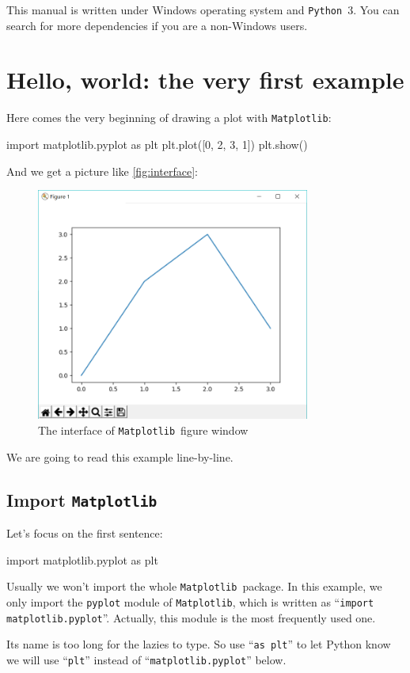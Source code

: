 \documentclass{report}
\newcommand{\pkg}[1]{\texttt{#1}}
\newcommand{\Py}{\pkg{Python}}
\newcommand{\mpl}{\texttt{Matplotlib}}
\newcommand{\nextblock}{\vspace{2ex}}
\begin{document}
\nextblock This manual is written under Windows operating system and \Py\ 3. You can search for more dependencies if you are a non-Windows users.

\section{Hello, world: the very first example}
Here comes the very beginning of drawing a plot with \mpl :
\begin{py}
import matplotlib.pyplot as plt
plt.plot([0, 2, 3, 1])
plt.show()
\end{py}

And we get a picture like \autoref{fig:interface}:

\begin{figure}[!htb]
  \centering
  \includegraphics[width=90mm]{Example-Interface.png}
  \caption{The interface of \mpl\ figure window}
  \label{fig:interface}
\end{figure}

We are going to read this example line-by-line.

\subsection{Import \mpl}
Let's focus on the first sentence:
\begin{py}
import matplotlib.pyplot as plt
\end{py}

Usually we won't import the whole \mpl\ package. In this example, we only import the \texttt{pyplot} module of \mpl , which is written as ``\texttt{import matplotlib.pyplot}''. Actually, this module is the most frequently used one. 

Its name is too long for the lazies to type. So use ``\texttt{as plt}'' to let Python know we will use ``\texttt{plt}'' instead of ``\texttt{matplotlib.pyplot}'' below.
\end{document}
